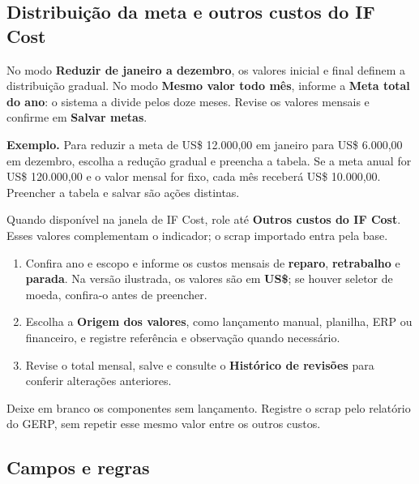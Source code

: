 \Needspace{140pt}
\subsection*{Distribuição da meta e outros custos do IF Cost}


No modo \textbf{Reduzir de janeiro a dezembro}, os valores inicial e final definem
a distribuição gradual. No modo \textbf{Mesmo valor todo mês}, informe a
\textbf{Meta total do ano}: o sistema a divide pelos doze meses. Revise os valores
mensais e confirme em \textbf{Salvar metas}.

\textbf{Exemplo.} Para reduzir a meta de US\$ 12.000,00 em janeiro para
US\$ 6.000,00 em dezembro, escolha a redução gradual e preencha a tabela.
Se a meta anual for US\$ 120.000,00 e o valor mensal for fixo, cada mês receberá
US\$ 10.000,00. Preencher a tabela e salvar são ações distintas.

Quando disponível na janela de IF Cost, role até \textbf{Outros custos do IF Cost}.
Esses valores complementam o indicador; o scrap importado entra pela base.
\begin{enumerate}
\item Confira ano e escopo e informe os custos mensais de \textbf{reparo},
\textbf{retrabalho} e \textbf{parada}. Na versão ilustrada, os valores são em
\textbf{US\$}; se houver seletor de moeda, confira-o antes de preencher.
\item Escolha a \textbf{Origem dos valores}, como lançamento manual, planilha,
ERP ou financeiro, e registre referência e observação quando necessário.
\item Revise o total mensal, salve e consulte o \textbf{Histórico de revisões}
para conferir alterações anteriores.
\end{enumerate}
Deixe em branco os componentes sem lançamento. Registre o scrap pelo relatório
do GERP, sem repetir esse mesmo valor entre os outros custos.



\Needspace{160pt}

\subsection*{Campos e regras}

